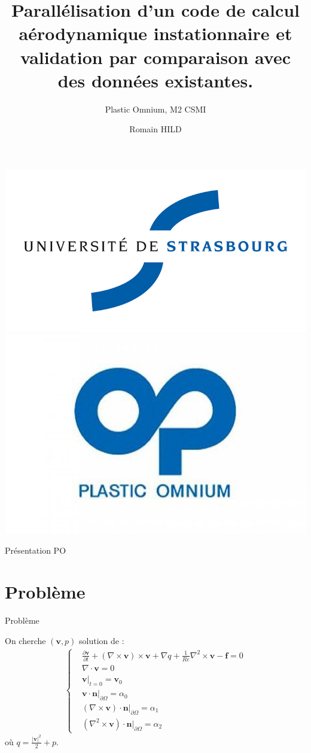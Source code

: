\documentclass{beamer}
\title[Stage]{Parallélisation d'un code de calcul aérodynamique instationnaire et validation par comparaison avec des données existantes.}
\subtitle{Plastic Omnium, M2 CSMI}
\author{Romain HILD}
\institute{Université de Strasbourg}
\newcommand{\grad}{{\nabla}}
\newcommand{\rot}{{\nabla\times}}
\newcommand{\rott}{{\nabla^2\times}}
\renewcommand{\div}{{\nabla\cdot}}
\newcommand{\restr}{{\big\rvert_{\partial\Omega}}}
\begin{document}
\begin{frame}
\includegraphics[scale=0.2]{uds.jpg}\includegraphics[scale=0.15]{po.jpg}
\titlepage
\end{frame}

\begin{frame}
Présentation PO
\end{frame}

\section{Problème}
\begin{frame}{Problème}
\begin{block}{On cherche $(\mathbf{v},p)$ solution de :}
\begin{eqnarray}
\label{depart}
\left\{\begin{aligned}
&\frac{\partial \mathbf{v}}{\partial t} + (\rot  \mathbf{v})\times \mathbf{v} + \grad q + \frac{1}{Re}\rott  \mathbf{v}-\mathbf{f} = 0\\
&\div \mathbf{v} = 0\\
&\mathbf{v}\big\rvert_{t=0} = \mathbf{v}_0\\
&\mathbf{v}\cdot \mathbf{n}\restr = \alpha_0\\
&(\rot  \mathbf{v})\cdot \mathbf{n}\restr = \alpha_1\\
&(\rott  \mathbf{v})\cdot \mathbf{n}\restr = \alpha_2
\end{aligned}\right.
\end{eqnarray}
où $q = \frac{|\mathbf{v}|^2}{2}+p$.
\end{block}
\end{frame}
\end{document}

